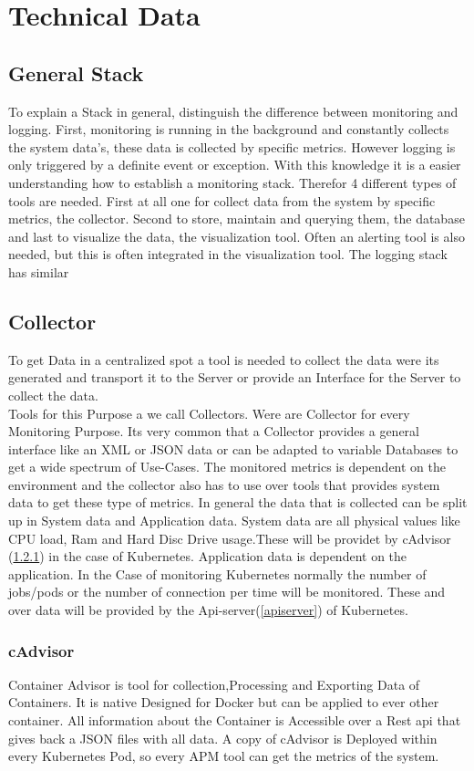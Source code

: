  
\chapter{Technical Data}
\label{chap:ch2}
\section{General Stack}
To explain a Stack in general, distinguish the difference between monitoring and logging. First, monitoring is running in the background and constantly collects the system data's, these data is collected by specific metrics. However logging is only triggered by a definite event or exception.
With this knowledge it is a easier understanding how to establish a monitoring stack. Therefor 4 different types of tools are needed.
First at all one for collect data from the system by specific metrics, the collector. Second to store, maintain and querying them, the database and last to visualize the data, the visualization tool. Often an alerting tool is also needed, but this is often integrated in the visualization tool.
The logging stack has similar 

\section{Collector}
To get Data in a centralized spot a tool is needed to collect the data were its generated and transport it to the Server or provide an Interface for the Server to collect the data.\\
Tools for this Purpose a we call Collectors. Were are Collector for every Monitoring Purpose. Its very common that a Collector provides a general interface like an XML or JSON data or can be adapted to variable Databases to get a wide spectrum of Use-Cases. The monitored metrics is dependent on the environment and the collector also has to use over tools that provides system data to get these type of metrics. In general the data that is collected can be split up in System data and Application data. System data are all physical values like CPU load, Ram and Hard Disc Drive usage.These will be providet by cAdvisor (\ref{cadvisor}) in the case of Kubernetes. Application data is dependent on the application. In the Case of monitoring Kubernetes normally the number of jobs/pods or the number of connection per time will be monitored. These and over data will be provided by the Api-server(\ref{apiserver}) of Kubernetes.
\subsection{cAdvisor}
\label{cadvisor}
Container Advisor is tool for collection,Processing and Exporting Data of Containers. It is native Designed for Docker but can be applied to ever other container. All information about the Container is Accessible over a Rest api that gives back a JSON files with all data. A copy of cAdvisor is Deployed within every Kubernetes Pod, so every APM tool can get the metrics of the system.
